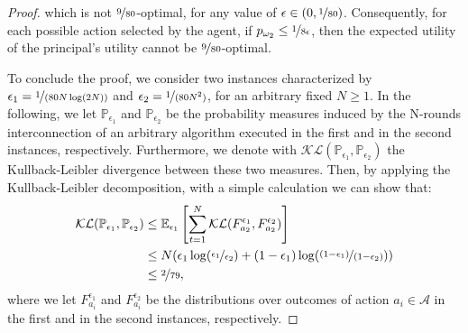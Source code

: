 \begin{proof}
		which is not $\nicefrac{9}{80}$-optimal, for any value of $\epsilon \in (0, \nicefrac{1}{80})$. Consequently, for each possible action selected by the agent, if $p_{\omega_2} \le \nicefrac{1}{8\epsilon}$, then the expected utility of the principal's utility cannot be $\nicefrac{9}{80}$-optimal.
		
		
		To conclude the proof, we consider two instances characterized by $\epsilon_1 = \nicefrac{1}{(80 N \log(2N) )} $ and $\epsilon_2 = \nicefrac{1}{(80 N^2) } $, for an arbitrary fixed $N \ge 1$. In the following, we let $\mathbb{P}_{\epsilon_1}$ and $\mathbb{P}_{\epsilon_2}$ be the probability measures induced by the N-rounds interconnection of an arbitrary algorithm executed in the first and in the second instances, respectively. Furthermore, we denote with  $\mathcal{KL}(\mathbb{P}_{\epsilon_1},\mathbb{P}_{\epsilon_2})$ the Kullback-Leibler divergence between these two measures. Then, by applying the Kullback-Leibler decomposition, with a simple calculation we can show that:
		\begin{align*}
			\mathcal{KL}(\mathbb{P}_{\epsilon_1}, \mathbb{P}_{\epsilon_2} ) & \le \mathbb{E}_{\epsilon_1} \left[\sum_{t=1}^N \mathcal{KL}(F^{\epsilon_1}_{a_2}, F^{\epsilon_2}_{a_2}) \right] \\
			& \le N (\epsilon_1 \log(\nicefrac{ \epsilon_1}{ \epsilon_2}) + (1- \epsilon_1) \log(\nicefrac{(1- \epsilon_1)}{ (1- \epsilon_2)}) ) \\
			& \le  \nicefrac{2}{79} ,
		\end{align*}
		where we let $F^{\epsilon_1}_{a_i}$ and $F^{\epsilon_2}_{a_i}$ be the distributions over outcomes of action $a_i \in \mathcal{A}$ in the first and in the second instances, respectively.
		

\end{proof}
